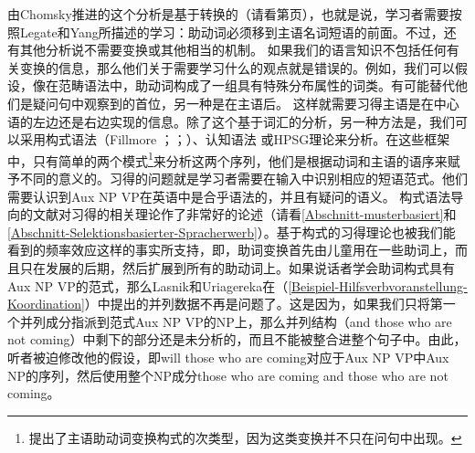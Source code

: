 \noindent
由Chomsky推进的这个分析是基于转换的（请看第\pageref{Seite-GB-Entscheidungsfragen-Englisch}页），也就是说，学习者需要按照Legate和Yang所描述的学习：助动词必须移到主语名词短语的前面。不过，还有其他分析说不需要变换或其他相当的机制。
如果我们的语言知识不包括任何有关变换的信息，那么他们关于需要学习什么的观点就是错误的。例如，我们可以假设，像在范畴语法中，助动词构成了一组具有特殊分布属性的词类。有可能替代他们是疑问句中观察到的首位，另一种是在主语后\citep[]{Villavicencio2002a}。
这样就需要习得主语是在中心语的左边还是右边实现的信息。除了这个基于词汇的分析，另一种方法是，我们可以采用构式语法（Fillmore \citeyear[]{Fillmore88a}；\citeyear{Fillmore99a}；\citealp[]{KF99a}）、认知语法 \citep[\S~9]{Dabrowska2004a}或HPSG理论\indexhpsg \citep{GSag2000a-u}来分析。在这些框架中，只有简单的两个模式\footnote{%
	 \citet{Fillmore99a}提出了主语助动词变换构式的次类型，因为这类变换并不只在问句中出现。
}来分析这两个序列，他们是根据动词和主语的语序来赋予不同的意义的。习得的问题就是学习者需要在输入中识别相应的短语范式。他们需要认识到Aux NP VP在英语中是合乎语法的，并且有疑问的语义。
构式语法导向的文献对习得的相关理论作了非常好的论述（请看\ref{Abschnitt-musterbasiert}和\ref{Abschnitt-Selektionsbasierter-Spracherwerb}）。基于构式的习得理论也被我们能看到的频率效应这样的事实所支持，即，助词变换首先由儿童用在一些助词上，而且只在发展的后期，然后扩展到所有的助动词上。如果说话者学会助词构式具有Aux NP
VP的范式，那么Lasnik和Uriagereka在（\ref{Beispiel-Hilfsverbvoranstellung-Koordination}）中提出的并列数据不再是问题了。这是因为，如果我们只将第一个并列成分指派到范式Aux NP VP的NP上，那么并列结构（and those who are not coming）中剩下的部分还是未分析的，而且不能被整合进整个句子中。由此，听者被迫修改他的假设，即will those who are coming对应于Aux NP VP中Aux NP的序列，然后使用整个NP成分those who are coming and those who are not coming。
